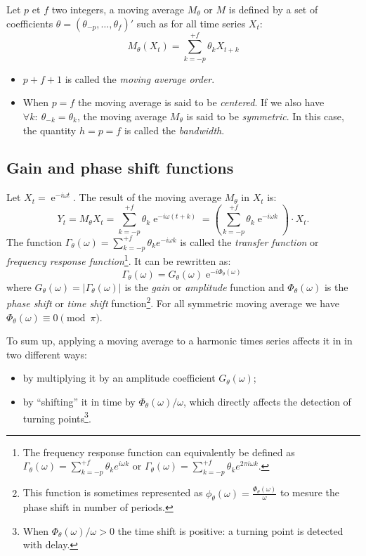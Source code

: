 \documentclass[
  12pt,
  ,
  a4paper]{article}
\DeclareMathOperator{\e}{e}
\newcommand\1{\mathds{1}}
\begin{document}
Let \(p\) et \(f\) two integers, a moving average \(M_\theta\) or \(M\) is defined by a set of coefficients \(\theta=(\theta_{-p},\dots,\theta_{f})'\) such as for all time series \(X_t\):
\[
M_\theta(X_t)=\sum_{k=-p}^{+f}\theta_kX_{t+k}
\]

\begin{itemize}
\item
  \(p+f+1\) is called the \emph{moving average order}.
\item
  When \(p=f\) the moving average is said to be \emph{centered}.
  If we also have \(\forall k:\:\theta_{-k} = \theta_k\), the moving average \(M_\theta\) is said to be \emph{symmetric}.
  In this case, the quantity \(h=p=f\) is called the \emph{bandwidth}.
\end{itemize}

\hypertarget{gain-and-phase-shift-functions}{%
\subsection{Gain and phase shift functions}\label{gain-and-phase-shift-functions}}

Let \(X_t=\e^{-i\omega t}\). The result of the moving average \(M_\theta\) in \(X_t\) is:
\[
Y_t = M_{\theta}X_t = \sum_{k=-p}^{+f} \theta_k \e^{-i \omega (t+k)}
= \left(\sum_{k=-p}^{+f} \theta_k \e^{-i \omega k}\right)\cdot X_t.
\]
The function \(\Gamma_\theta(\omega)=\sum_{k=-p}^{+f} \theta_k e^{-i \omega k}\) is called the \emph{transfer function} or \emph{frequency response function}\footnote{The frequency response function can equivalently be defined as \(\Gamma_\theta(\omega)=\sum_{k=-p}^{+f} \theta_k e^{i \omega k}\) or \(\Gamma_\theta(\omega)=\sum_{k=-p}^{+f} \theta_k e^{2\pi i \omega k}\).}.
It can be rewritten as:
\[
\Gamma_\theta(\omega) = G_\theta(\omega)\e^{-i\Phi_\theta(\omega)}
\]
where \(G_\theta(\omega)=\lvert\Gamma_\theta(\omega)\rvert\) is the \emph{gain} or \emph{amplitude} function and \(\Phi_\theta(\omega)\) is the \emph{phase shift} or \emph{time shift} function\footnote{This function is sometimes represented as \(\phi_\theta(\omega)=\frac{\Phi_\theta(\omega)}{\omega}\) to mesure the phase shift in number of periods.}.
For all symmetric moving average we have \(\Phi_\theta(\omega)\equiv 0 \pmod{\pi}\).

To sum up, applying a moving average to a harmonic times series affects it in in two different ways:

\begin{itemize}
\item
  by multiplying it by an amplitude coefficient \(G_{\theta}\left(\omega\right)\);
\item
  by ``shifting'' it in time by \(\Phi_\theta(\omega)/\omega\), which directly affects the detection of turning points\footnote{When \(\Phi_\theta(\omega)/\omega>0\) the time shift is positive: a turning point is detected with delay.}.
\end{itemize}
\end{document}
